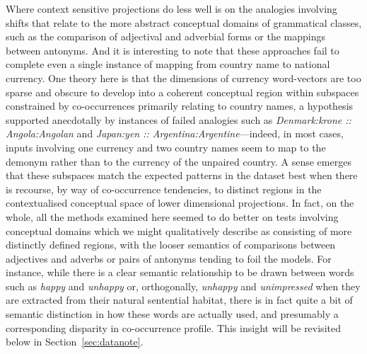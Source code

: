 Where context sensitive projections do less well is on the analogies involving shifts that relate to the more abstract conceptual domains of grammatical classes, such as the comparison of adjectival and adverbial forms or the mappings between antonyms.  And it is interesting to note that these approaches fail to complete even a single instance of mapping from country name to national currency.  One theory here is that the dimensions of currency word-vectors are too sparse and obscure to develop into a coherent conceptual region within subspaces constrained by co-occurrences primarily relating to country names, a hypothesis supported anecdotally by instances of failed analogies such as \emph{Denmark:krone :: Angola:Angolan} and \emph{Japan:yen :: Argentina:Argentine}---indeed, in most cases, inputs involving one currency and two country names seem to map to the demonym rather than to the currency of the unpaired country.  A sense emerges that these subspaces match the expected patterns in the dataset best when there is recourse, by way of co-occurrence tendencies, to distinct regions in the contextualised conceptual space of lower dimensional projections.  In fact, on the whole, all the methods examined here seemed to do better on tests involving conceptual domains which we might qualitatively describe as consisting of more distinctly defined regions, with the looser semantics of comparisons between adjectives and adverbs or pairs of antonyms tending to foil the models.  For instance, while there is a clear semantic relationship to be drawn between words such as \emph{happy} and \emph{unhappy} or, orthogonally, \emph{unhappy} and \emph{unimpressed} when they are extracted from their natural sentential habitat, there is in fact quite a bit of semantic distinction in how these words are actually used, and presumably a corresponding disparity in co-occurrence profile.  This insight will be revisited below in Section~\ref{sec:datanote}.

